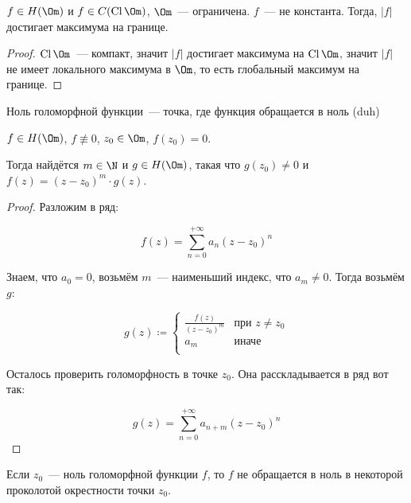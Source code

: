 \begin{consequence}
    $f \in H(\Om)$ и $f \in C(\operatorname{Cl} \Om)$,
    $\Om$~--- ограничена.
    $f$~--- не константа.
    Тогда, $|f|$ достигает максимума на границе.
\end{consequence}

\begin{proof}
    $\operatorname{Cl} \Om$~--- компакт,
    значит $|f|$ достигает максимума
    на $\operatorname{Cl} \Om$,
    значит $|f|$ не имеет локального максимума
    в $\Om$, то есть глобальный максимум на границе.
\end{proof}

\begin{definition}
    Ноль голоморфной функции~--- точка, где
    функция обращается в ноль (duh)
\end{definition}

\begin{theorem}
    $f \in H(\Om)$, $f\not\equiv 0$,
    $z_0 \in \Om$, $f(z_0) = 0$.

    Тогда найдётся $m \in \N$
    и $g \in H(\Om)$, такая что $g(z_0) \ne 0$
    и $f(z) = (z-z_0)^m \cdot g(z)$.
\end{theorem}

\begin{proof}
    Разложим в ряд:

    \[
        f(z) = \sum_{n=0}^{+\infty}
        a_n(z-z_0)^n
    \]

    Знаем, что $a_0 = 0$,
    возьмём $m$~--- наименьший индекс, что
    $a_m \ne 0$. Тогда возьмём $g$:

    \[
        g(z) \coloneqq \begin{cases}
            \frac{f(z)}{(z-z_0)^m} & \text{при } z \ne z_0 \\
            a_m                    & \text{иначе}          \\
        \end{cases}
    \]

    Осталось проверить голоморфность
    в точке $z_0$.
    Она расскладывается в ряд вот так:

    \[
        g(z) = \sum_{n=0}^{+\infty}
        a_{n+m}(z-z_0)^n
    \]
\end{proof}

\begin{consequence}
    Если $z_0$~--- ноль голоморфной функции $f$,
    то $f$ не обращается в ноль в некоторой проколотой
    окрестности точки $z_0$.
\end{consequence}

